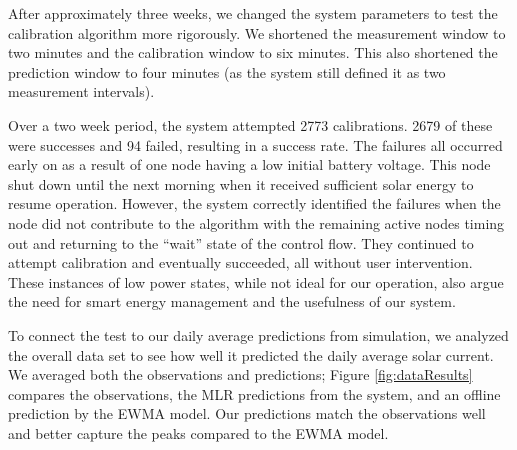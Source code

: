 \documentclass[prodmode,acmtosn]{acmsmall}
\begin{document}
After approximately three weeks, we changed the system parameters to test the calibration algorithm more rigorously.
We shortened the measurement window to two minutes and the calibration window to six minutes.
This also shortened the prediction window to four minutes (as the system still defined it as two measurement intervals).

Over a two week period, the system attempted 2773 calibrations.
2679 of these were successes and 94 failed, resulting in a  success rate.
The failures all occurred early on as a result of one node having a low initial battery voltage.
This node shut down until the next morning when it received sufficient solar energy to resume operation.
However, the system correctly identified the failures when the node did not contribute to the algorithm with the remaining active nodes timing out and returning to the ``wait'' state of the control flow.
They continued to attempt calibration and eventually succeeded, all without user intervention.
These instances of low power states, while not ideal for our operation, also argue the need for smart energy management and the usefulness of our system.

To connect the test to our daily average predictions from simulation, we analyzed the overall data set to see how well it predicted the daily average solar current.
We averaged both the observations and predictions; Figure \ref{fig:dataResults} compares the observations, the MLR predictions from the system, and an offline prediction by the EWMA model.
Our predictions match the  observations well and better capture the peaks compared to the EWMA model.

\begin{table}[htb]
\centering
{}
\end{table}
\end{document}
